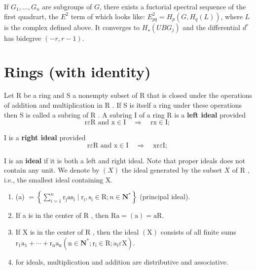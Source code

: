 \begin{prop}
If $G_1, \ldots, G_n$ are subgroups of $G$, there exists a fuctorial spectral sequence of the first quadrart, the $E^2$ term of which looks like: $E_{p q}^2=H_p\left(G, H_q(L)\right)$, where $L$ is the complex defined above. It converges to $H_{\star}\left(U B G_j\right)$ and the differential $d^r$ has bidegree $(-r, r-1)$.   
\end{prop}





\chapter{Rings (with identity)}

Let R be a ring and S a nonempty subset of R that is closed under the operations of addition and multiplication in R . If S is itself a ring under these operations then S is called a subring of R . A subring I of a ring R is a \textbf{left ideal} provided
$$
\mathrm{r} \varepsilon \mathrm{R} \text { and } \mathrm{x} \in \mathrm{I} \quad \Rightarrow \quad \mathrm{rx} \in \mathrm{I} \text {; }
$$

I is a \textbf{right ideal} provided
$$
\mathrm{r} \varepsilon \mathrm{R} \text { and } \mathrm{x} \in \mathrm{I} \quad \Rightarrow \quad \mathrm{xr} \varepsilon \mathrm{I} \text {; }
$$

I is an \textbf{ideal} if it is both a left and right ideal. Note that proper ideals does not contain any unit. We denote by $(X)$ the ideal generated by the subset $X$ of R , i.e., the smallest ideal containing X.
\begin{theo}
    \begin{enumerate}
        \item (a) $=\left\{\sum_{i=1}^n \mathrm{r}_{\mathrm{j}} \mathrm{as}_{\mathrm{i}} \mid \mathrm{r}_{\mathrm{i}}, \mathrm{s}_{\mathrm{i}} \in \mathrm{R} ; n \in \mathbf{N}^*\right\}$ (principal ideal).
        \item If a is in the center of R , then $\mathrm{Ra}=(\mathrm{a})=\mathrm{aR}$.
        \item If X is in the center of R , then the ideal $(\mathrm{X})$ consists of all finite sums $\mathrm{r}_1 \mathrm{a}_1+\cdots+\mathrm{r}_{\mathrm{n}} \mathrm{a}_{\mathrm{n}}\left(\mathrm{n} \in \mathbf{N}^* ; \mathrm{r}_{\mathrm{i}} \in \mathrm{R} ; \mathrm{a}_{\mathrm{i}} \varepsilon \mathrm{X}\right)$.
        \item for ideals, multiplication and addition are distributive and associative.
    \end{enumerate}
\end{theo}


